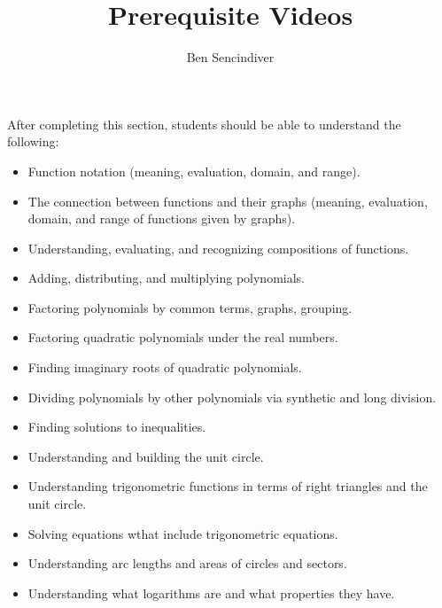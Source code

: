 \documentclass{ximera}
\title{Prerequisite Videos}
\author{Ben Sencindiver}
\begin{document}
\begin{abstract}
\end{abstract}

\maketitle

\begin{sectionOutcomes}
After completing this section, students should be able to understand the following: 

\begin{itemize}
	\item Function notation (meaning, evaluation, domain, and range).
    \item The connection between functions and their graphs (meaning, evaluation, domain, and range of functions given by graphs).
    \item Understanding, evaluating, and recognizing compositions of functions.
    \item Adding, distributing, and multiplying polynomials.
    \item Factoring polynomials by common terms, graphs, grouping.
    \item Factoring quadratic polynomials under the real numbers.
    \item Finding imaginary roots of quadratic polynomials.
    \item Dividing polynomials by other polynomials via synthetic and long division.
    \item Finding solutions to inequalities.
    \item Understanding and building the unit circle.
    \item Understanding trigonometric functions in terms of right triangles
    and the unit circle.
    \item Solving equations wthat include trigonometric equations.
    \item Understanding arc lengths and areas of circles and sectors.
    \item Understanding what logarithms are and what properties they have.
\end{itemize}


\end{sectionOutcomes}
\end{document}

